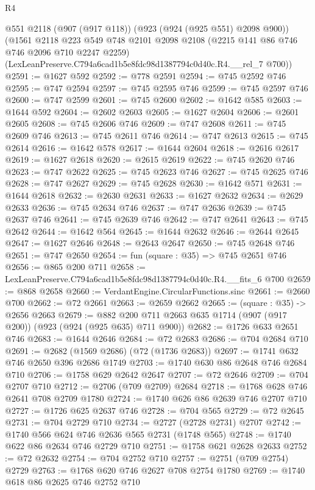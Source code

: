 \begin{lexlean}{R4}
\begin{coremodule}
    @551
    @2118
    (@907 (@917 @118))
    (@923 (@924 (@925 @551) @2098 @900))
    (@1561
      @2118
      @223
      @549
      @748
      @2101
      @2098
      @2108
      (@2215 @141 @86 @746 @746 @2096 @710 @2247 @2259)
      (LexLeanPreserve.C794a6cad1b5e8fdc98d1387794c0d40c.R4.__rel_7 @700))
@2591 := @1627 @592
@2592 := @778 @2591
@2594 := @745 @2592 @746
@2595 := @747 @2594
@2597 := @745 @2595 @746
@2599 := @745 @2597 @746
@2600 := @747 @2599
@2601 := @745 @2600
@2602 := @1642 @585
@2603 := @1644 @592
@2604 := @2602 @2603
@2605 := @1627 @2604
@2606 := @2601 @2605
@2608 := @745 @2606 @746
@2609 := @747 @2608
@2611 := @745 @2609 @746
@2613 := @745 @2611 @746
@2614 := @747 @2613
@2615 := @745 @2614
@2616 := @1642 @578
@2617 := @1644 @2604
@2618 := @2616 @2617
@2619 := @1627 @2618
@2620 := @2615 @2619
@2622 := @745 @2620 @746
@2623 := @747 @2622
@2625 := @745 @2623 @746
@2627 := @745 @2625 @746
@2628 := @747 @2627
@2629 := @745 @2628
@2630 := @1642 @571
@2631 := @1644 @2618
@2632 := @2630 @2631
@2633 := @1627 @2632
@2634 := @2629 @2633
@2636 := @745 @2634 @746
@2637 := @747 @2636
@2639 := @745 @2637 @746
@2641 := @745 @2639 @746
@2642 := @747 @2641
@2643 := @745 @2642
@2644 := @1642 @564
@2645 := @1644 @2632
@2646 := @2644 @2645
@2647 := @1627 @2646
@2648 := @2643 @2647
@2650 := @745 @2648 @746
@2651 := @747 @2650
@2654 := fun (square : @35) => @745 @2651 @746
@2656 := @865 @200 @711
@2658 := LexLeanPreserve.C794a6cad1b5e8fdc98d1387794c0d40c.R4.__fits_6 @700
@2659 := @868 @2658
@2660 := VerdantEngine.CircularFunctions.sinc
@2661 := @2660 @700
@2662 := @72 @2661
@2663 := @2659 @2662
@2665 := (square : @35) -> @2656 @2663
@2679 := @882 @200 @711 @2663 @635 @1714 (@907 (@917 @200)) (@923 (@924 (@925 @635) @711 @900))
@2682 := @1726 @633 @2651 @746
@2683 := @1644 @2646
@2684 := @72 @2683
@2686 := @704 @2684 @710
@2691 := @2682 (@1569 @2686) (@72 (@1736 @2683))
@2697 := @1741 @632 @746 @2650 @396 @2686 @1749
@2703 := @1740 @630 @86 @2648 @746 @2684 @710
@2706 := @1758 @629 @2642 @2647
@2707 := @72 @2646
@2709 := @704 @2707 @710
@2712 := @2706 (@709 @2709) @2684
@2718 := @1768 @628 @746 @2641 @708 @2709 @1780
@2724 := @1740 @626 @86 @2639 @746 @2707 @710
@2727 := @1726 @625 @2637 @746
@2728 := @704 @565
@2729 := @72 @2645
@2731 := @704 @2729 @710
@2734 := @2727 (@2728 @2731) @2707
@2742 := @1740 @566 @624 @746 @2636 @565 @2731 (@1748 @565)
@2748 := @1740 @622 @86 @2634 @746 @2729 @710
@2751 := @1758 @621 @2628 @2633
@2752 := @72 @2632
@2754 := @704 @2752 @710
@2757 := @2751 (@709 @2754) @2729
@2763 := @1768 @620 @746 @2627 @708 @2754 @1780
@2769 := @1740 @618 @86 @2625 @746 @2752 @710

\end{coremodule}
\end{lexlean}

